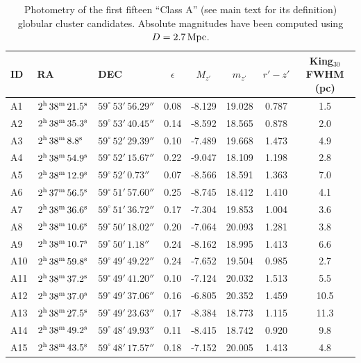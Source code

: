 \documentclass[useAMS,usenatbib]{mn2e}
\begin{document}
\begin{table}
 \centering
 \caption{Photometry of the first fifteen ``Class A'' (see main text for its definition) globular cluster candidates. Absolute magnitudes have been computed using $D = 2.7\,\rm{Mpc}$.}
\label{tab:class_a}  
\begin{tabular}{lllccccc}
	\hline
	ID & RA & DEC & $\epsilon$ & $M_{z'}$ & $m_{z'}$ & $r'-z'$ & King$_{30}$ FWHM (pc) \\
	\hline
	A1 & $2^{\rm{h}}\,38^{\rm{m}}\,21.5^{\rm{s}}$ & $59^\circ\,53'\,56.29''$ & 0.08 & -8.129 & 19.028 & 0.787 & 1.5 \\
	A2 & $2^{\rm{h}}\,38^{\rm{m}}\,35.3^{\rm{s}}$ & $59^\circ\,53'\,40.45''$ & 0.14 & -8.592 & 18.565 & 0.878 & 2.0 \\
	A3 & $2^{\rm{h}}\,38^{\rm{m}}\,8.8^{\rm{s}}$ & $59^\circ\,52'\,29.39''$ & 0.10 & -7.489 & 19.668 & 1.473 & 4.9 \\
	A4 & $2^{\rm{h}}\,38^{\rm{m}}\,54.9^{\rm{s}}$ & $59^\circ\,52'\,15.67''$ & 0.22 & -9.047 & 18.109 & 1.198 & 2.8 \\
	A5 & $2^{\rm{h}}\,38^{\rm{m}}\,12.9^{\rm{s}}$ & $59^\circ\,52'\,0.73''$ & 0.07 & -8.566 & 18.591 & 1.363 & 7.0 \\
	A6 & $2^{\rm{h}}\,37^{\rm{m}}\,56.5^{\rm{s}}$ & $59^\circ\,51'\,57.60''$ & 0.25 & -8.745 & 18.412 & 1.410 & 4.1 \\
	A7 & $2^{\rm{h}}\,38^{\rm{m}}\,36.6^{\rm{s}}$ & $59^\circ\,51'\,36.72''$ & 0.17 & -7.304 & 19.853 & 1.004 & 3.6 \\
	A8 & $2^{\rm{h}}\,38^{\rm{m}}\,10.6^{\rm{s}}$ & $59^\circ\,50'\,18.02''$ & 0.20 & -7.064 & 20.093 & 1.281 & 3.8 \\
	A9 & $2^{\rm{h}}\,38^{\rm{m}}\,10.7^{\rm{s}}$ & $59^\circ\,50'\,1.18''$ & 0.24 & -8.162 & 18.995 & 1.413 & 6.6 \\
	A10 & $2^{\rm{h}}\,38^{\rm{m}}\,59.8^{\rm{s}}$ & $59^\circ\,49'\,49.22''$ & 0.24 & -7.652 & 19.504 & 0.985 & 2.7 \\
	A11 & $2^{\rm{h}}\,38^{\rm{m}}\,37.2^{\rm{s}}$ & $59^\circ\,49'\,41.20''$ & 0.10 & -7.124 & 20.032 & 1.513 & 5.5 \\
	A12 & $2^{\rm{h}}\,38^{\rm{m}}\,37.0^{\rm{s}}$ & $59^\circ\,49'\,37.06''$ & 0.16 & -6.805 & 20.352 & 1.459 & 10.5 \\
	A13 & $2^{\rm{h}}\,38^{\rm{m}}\,27.5^{\rm{s}}$ & $59^\circ\,49'\,23.63''$ & 0.17 & -8.384 & 18.773 & 1.115 & 11.3 \\
	A14 & $2^{\rm{h}}\,38^{\rm{m}}\,49.2^{\rm{s}}$ & $59^\circ\,48'\,49.93''$ & 0.11 & -8.415 & 18.742 & 0.920 & 9.8 \\
	A15 & $2^{\rm{h}}\,38^{\rm{m}}\,43.5^{\rm{s}}$ & $59^\circ\,48'\,17.57''$ & 0.18 & -7.152 & 20.005 & 1.413 & 4.8 \\
	\hline
\end{tabular}
\end{table}
\end{document}
